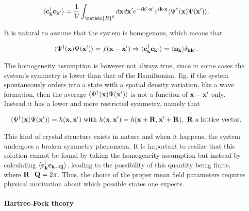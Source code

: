 \documentclass{homework}
\begin{document}
\begin{equation}
    \langle {\bf c}_{{\bf k}}^\dagger {\bf c}_{{\bf k}'} \rangle = \frac{1}{\mathcal{V}} \int_{\mathds{R}^6} d{\bf x} d{\bf x}' e^{-i {\bf k}' \cdot {\bf x}'} e^{i {\bf k} \cdot {\bf x}} \langle \Psi^\dagger({\bf x}) \Psi({\bf x}') \rangle.
\end{equation}

It is natural to assume that the system is homogenous, which means that 

\begin{equation}
    \langle \Psi^\dagger({\bf x}) \Psi({\bf x}') \rangle = f({\bf x} - {\bf x}') \Rightarrow \langle {\bf c}_{{\bf k}}^\dagger {\bf c}_{{\bf k}'} \rangle = \langle {\bf n}_{\bf k} \rangle \delta_{{\bf k}{\bf k}'}.
\end{equation}

The homogeneity assumption is however not always true, since in some cases the system's symmetry is lower than that of the Hamiltonian. Eg. if the system spontaneously orders into a state with a spatial density variation, like a wave formation, then the average $\langle \Psi^\dagger({\bf x}) \Psi({\bf x}') \rangle$ is not a function of ${\bf x} - {\bf x}'$ only. Instead it has a lower and more restricted symmetry, namely that 

$$
    \langle \Psi^\dagger({\bf x}) \Psi({\bf x}') \rangle = h({\bf x}, {\bf x}') \textnormal{ with } h({\bf x}, {\bf x}') = h({\bf x} + {\bf R}, {\bf x}' + {\bf R}), \textnormal{ ${\bf R}$ a lattice vector}.
$$

This kind of crystal structure exists in nature and when it happens, the system undergoes a broken symmetry phenomena. It is important to realize that this solution cannot be found by taking the homogeneity assumption but instead by calculating $ \langle {\bf c}_{{\bf k}}^\dagger {\bf c}_{{\bf k} + {\bf Q}} \rangle$, leading to the possibility of this quantity being finite, where ${\bf R} \cdot {\bf Q} = 2\pi$. Thus, the choice of the proper mean field parameters requires physical motivation about which possible states one expects. \\

\paragraph{\textbf{Hartree-Fock theory}}
\end{document}
